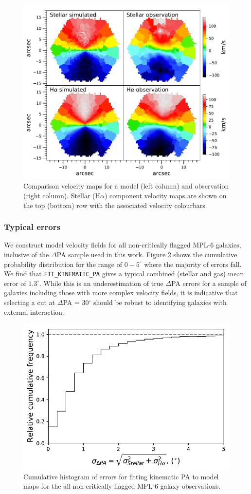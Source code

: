\begin{figure}
    \centering
	\includegraphics[width=0.7\linewidth]{thesis/latex/misalignment_MaNGA/obs_sim_IFU.pdf}
    \caption[Comparison velocity maps for a model (left column) and observation (right column).]{Comparison velocity maps for a model (left column) and observation (right column). Stellar (H$\alpha$) component velocity maps are shown on the top (bottom) row with the associated velocity colourbars.}
    \label{fig:sim_ifu}
\end{figure}

\subsubsection{Typical errors}
We construct model velocity fields for all non-critically flagged MPL-6 galaxies, inclusive of the $\Delta$PA sample used in this work. Figure \ref{fig:model_errors} shows the cumulative probability distribution for the range of $0-5^{\circ}$ where the majority of errors fall. We find that \texttt{FIT\_KINEMATIC\_PA} gives a typical combined (stellar and gas) mean error of $1.3^{\circ}$. While this is an underestimation of true $\Delta$PA errors for a sample of galaxies including those with more complex velocity fields, it is indicative that selecting a cut at $\Delta$PA = 30$^{\circ}$ should be robust to identifying galaxies with external interaction. 

\begin{figure}
    \centering
	\includegraphics[width=0.6\linewidth]{thesis/latex/misalignment_MaNGA/cumulative_model_errors.pdf}
    \caption{Cumulative histogram of errors for fitting kinematic PA to model maps for the all non-critically flagged MPL-6 galaxy observations.}
    \label{fig:model_errors}
\end{figure}

